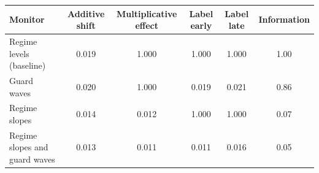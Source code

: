 \begin{tabular}{lccccc}
\toprule
Monitor & Additive shift & Multiplicative effect & Label early & Label late & Information \\
\midrule
Regime levels (baseline) & 0.019 & 1.000 & 1.000 & 1.000 & 1.00 \\
Guard waves & 0.020 & 1.000 & 0.019 & 0.021 & 0.86 \\
Regime slopes & 0.014 & 0.012 & 1.000 & 1.000 & 0.07 \\
Regime slopes and guard waves & 0.013 & 0.011 & 0.011 & 0.016 & 0.05 \\
\bottomrule
\end{tabular}
